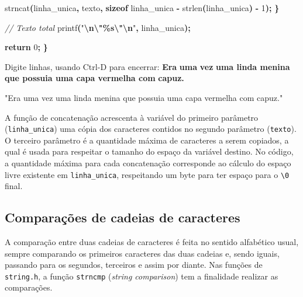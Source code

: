 \documentclass[
  11pt,
  a4paper,
]{scrbook}
\newenvironment{Shaded}{\begin{snugshade}}{\end{snugshade}}
\newcommand{\CommentTok}[1]{\textcolor[rgb]{0.56,0.35,0.01}{\textit{#1}}}
\newcommand{\ControlFlowTok}[1]{\textcolor[rgb]{0.13,0.29,0.53}{\textbf{#1}}}
\newcommand{\DecValTok}[1]{\textcolor[rgb]{0.00,0.00,0.81}{#1}}
\newcommand{\KeywordTok}[1]{\textcolor[rgb]{0.13,0.29,0.53}{\textbf{#1}}}
\newcommand{\NormalTok}[1]{#1}
\newcommand{\OperatorTok}[1]{\textcolor[rgb]{0.81,0.36,0.00}{\textbf{#1}}}
\newcommand{\SpecialCharTok}[1]{\textcolor[rgb]{0.81,0.36,0.00}{\textbf{#1}}}
\newcommand{\StringTok}[1]{\textcolor[rgb]{0.31,0.60,0.02}{#1}}
\begin{document}
\begin{Shaded}
\begin{Highlighting}[]
\NormalTok{        strncat}\OperatorTok{(}\NormalTok{linha\_unica}\OperatorTok{,}\NormalTok{ texto}\OperatorTok{,}
                \KeywordTok{sizeof}\NormalTok{ linha\_unica }\OperatorTok{{-}}\NormalTok{ strlen}\OperatorTok{(}\NormalTok{linha\_unica}\OperatorTok{)} \OperatorTok{{-}} \DecValTok{1}\OperatorTok{);}
    \OperatorTok{\}}

    \CommentTok{// Texto total}
\NormalTok{    printf}\OperatorTok{(}\StringTok{"}\SpecialCharTok{\textbackslash{}n\textbackslash{}"\%s\textbackslash{}"\textbackslash{}n}\StringTok{"}\OperatorTok{,}\NormalTok{ linha\_unica}\OperatorTok{);}

    \ControlFlowTok{return} \DecValTok{0}\OperatorTok{;}
\OperatorTok{\}}
\end{Highlighting}
\end{Shaded}

\begin{Shaded}
\begin{Highlighting}[]
\NormalTok{Digite linhas, usando Ctrl{-}D para encerrar:}
\KeywordTok{ Era }
\KeywordTok{ uma }
\KeywordTok{ vez }
\KeywordTok{ uma linda menina }
\KeywordTok{ que possuia uma capa vermelha com }
\KeywordTok{ capuz. }

\NormalTok{"Era uma vez uma linda menina que possuia uma capa vermelha com capuz."}
\end{Highlighting}
\end{Shaded}

A função de concatenação acrescenta à variável do primeiro parâmetro
(\texttt{linha\_unica}) uma cópia dos caracteres contidos no segundo
parâmetro (\texttt{texto}). O terceiro parâmetro é a quantidade máxima
de caracteres a serem copiados, a qual é usada para respeitar o tamanho
do espaço da variável destino. No código, a quantidade máxima para cada
concatenação corresponde ao cálculo do espaço livre existente em
\texttt{linha\_unica}, respeitando um byte para ter espaço para o
\texttt{\textbackslash{}0} final.

\subsection{Comparações de cadeias de
caracteres}\label{sec-comparacao-strings}

A comparação entre duas cadeias de caracteres é feita no sentido
alfabético usual, sempre comparando os primeiros caracteres das duas
cadeias e, sendo iguais, passando para os segundos, terceiros e assim
por diante. Nas funções de \texttt{string.h}, a função \texttt{strncmp}
(\emph{string comparison}) tem a finalidade realizar as comparações.
\end{document}
